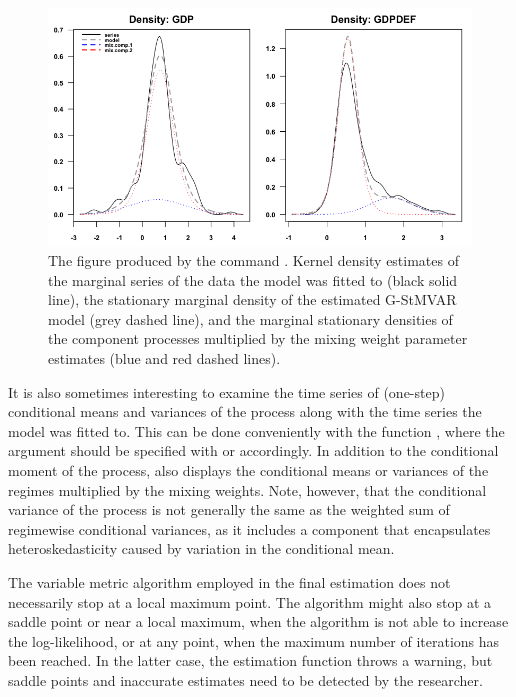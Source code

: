 \documentclass[nojss]{jss}
\begin{document}
\begin{figure}[p]
  \centering
  \includegraphics{figures/densityplot.png}
  \caption{The figure produced by the command . Kernel density estimates of the marginal series of the data the model was fitted to (black solid line), the stationary marginal density of the estimated G-StMVAR model (grey dashed line), and the marginal stationary densities of the component processes multiplied by the mixing weight parameter estimates (blue and red dashed lines).}
\label{fig:densityplot}
\end{figure}

It is also sometimes interesting to examine the time series of (one-step) conditional means and variances of the process along with the time series the model was fitted to. This can be done conveniently with the function , where the argument  should be specified with  or  accordingly. In addition to the conditional moment of the process,  also displays the conditional means or variances of the regimes multiplied by the mixing weights. Note, however, that the conditional variance of the process is not generally the same as the weighted sum of regimewise conditional variances, as it includes a component that encapsulates heteroskedasticity caused by variation in the conditional mean.

The variable metric algorithm employed in the final estimation does not necessarily stop at a local maximum point. The algorithm might also stop at a saddle point or near a local maximum, when the algorithm is not able to increase the log-likelihood, or at any point, when the maximum number of iterations has been reached. In the latter case, the estimation function throws a warning, but saddle points and inaccurate estimates need to be detected by the researcher.
\end{document}
